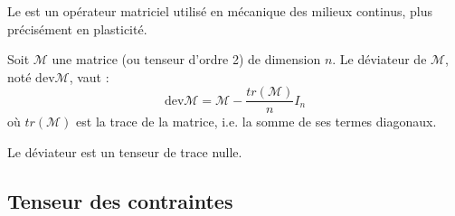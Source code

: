 Le  est un opérateur matriciel utilisé en mécanique des milieux continus, 
plus précisément en plasticité.

\medskip
Soit $\mathcal{M}$ une matrice (ou tenseur d'ordre 2) de dimension $n$. 
Le déviateur de $\mathcal{M}$, noté $\mathrm{dev} \mathcal{M}$, vaut :
\begin{equation}    \mathrm{dev} \mathcal{M}=\mathcal{M}-\frac{tr(\mathcal{M})}{n}I_n \end{equation}
où $tr(\mathcal{M})$ est la trace de la matrice, i.e. la somme de ses termes
diagonaux.

\medskip
Le déviateur est un tenseur de trace nulle.





\medskip
\subsection{Tenseur des contraintes}\label{Sec-TensS}

